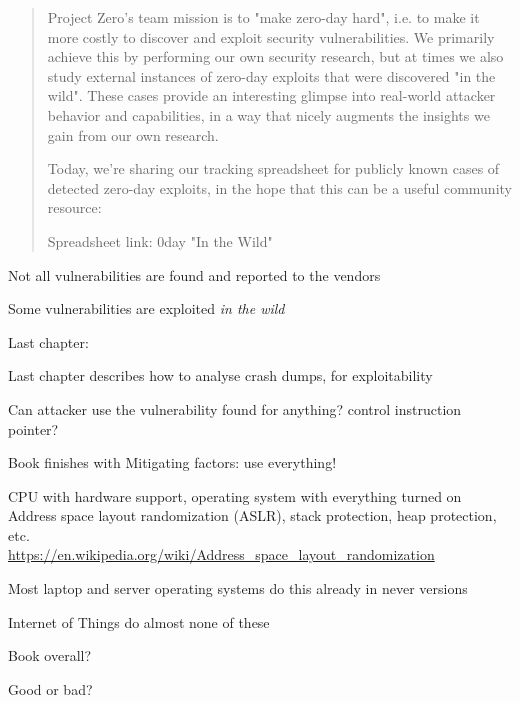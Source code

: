 \documentclass[Screen16to9,17pt]{foils}
\begin{document}
\begin{quote}

  Project Zero's team mission is to "make zero-day hard", i.e. to make it more costly to discover and exploit security vulnerabilities. We primarily achieve this by performing our own security research, but at times we also study external instances of zero-day exploits that were discovered "in the wild". These cases provide an interesting glimpse into real-world attacker behavior and capabilities, in a way that nicely augments the insights we gain from our own research.

  Today, we're sharing our tracking spreadsheet for publicly known cases of detected zero-day exploits, in the hope that this can be a useful community resource:

  Spreadsheet link: 0day "In the Wild"\\
\end{quote}

\begin{list2}
\item Not all vulnerabilities are found and reported to the vendors
\item Some vulnerabilities are exploited \emph{in the wild}
\end{list2}


Last chapter:
\begin{list2}
\item Last chapter describes how to analyse crash dumps, for exploitability
\item Can attacker use the vulnerability found for anything? control instruction pointer?
\item Book finishes with Mitigating factors: use everything!
\item CPU with hardware support, operating system with everything turned on Address space layout randomization (ASLR), stack protection, heap protection, etc.\\
\url{https://en.wikipedia.org/wiki/Address_space_layout_randomization}
\item Most laptop and server operating systems do this already in never versions\smiley
\item Internet of Things do almost none of these
\end{list2}

Book overall?

Good or bad?


\slidenext{}
\end{document}
